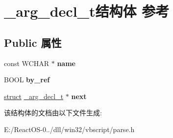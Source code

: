 \hypertarget{struct__arg__decl__t}{}\section{\+\_\+arg\+\_\+decl\+\_\+t结构体 参考}
\label{struct__arg__decl__t}
\subsection*{Public 属性}
\begin{DoxyCompactItemize}
\item 
\mbox{\label{struct__arg__decl__t_a541b627f82a87583e0813b9152943915}} 
const W\+C\+H\+AR $\ast$ {\bfseries name}
\item 
\mbox{\label{struct__arg__decl__t_a3ef66368938bcf96ec154bd2e2a2398c}} 
B\+O\+OL {\bfseries by\+\_\+ref}
\item 
\mbox{\label{struct__arg__decl__t_a32dc80dac247b58d5f1807d2021a36f6}} 
\hyperlink{interfacestruct}{struct} \hyperlink{struct__arg__decl__t}{\+\_\+arg\+\_\+decl\+\_\+t} $\ast$ {\bfseries next}
\end{DoxyCompactItemize}


该结构体的文档由以下文件生成\+:\begin{DoxyCompactItemize}
\item 
E\+:/\+React\+O\+S-\/0../dll/win32/vbscript/parse.\+h\end{DoxyCompactItemize}
